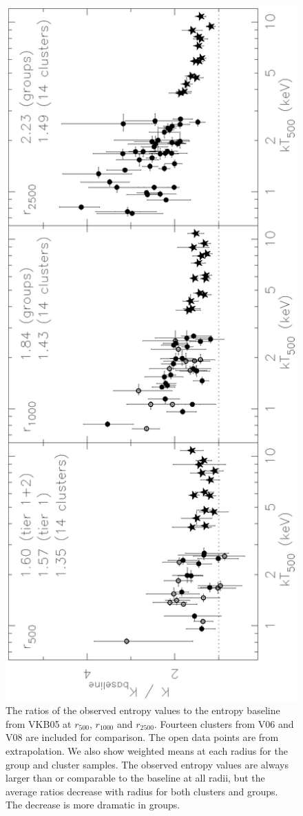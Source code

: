 \documentclass{aastex}
\begin{document}
\vspace{-1cm}
\begin{figure}
\centerline{\includegraphics[height=0.96\linewidth,angle=270]{f13.ps}}
  \caption{The ratios of the observed entropy values to the entropy baseline from
VKB05 at $r_{500}$, $r_{1000}$ and $r_{2500}$. Fourteen clusters from V06 and V08 are included
for comparison. The open data points are from extrapolation. We also show weighted
means at each radius for the group and cluster samples. The observed entropy values are
always larger than or comparable to the baseline at all radii, but the average ratios
decrease with radius for both clusters and groups. The decrease
is more dramatic in groups.
}
\end{figure}
\end{document}
